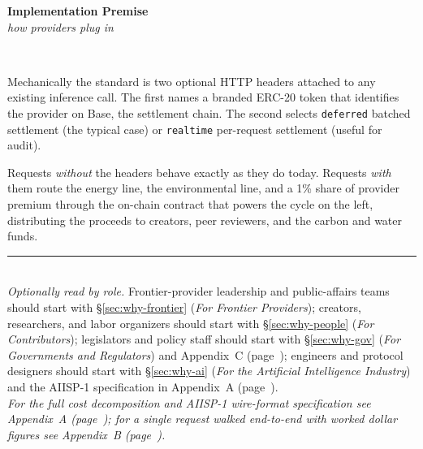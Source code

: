 \documentclass[10pt,a4paper,twocolumn]{article}
\begin{document}
\hfill
\begin{minipage}[t]{0.40\textwidth}
\vspace{0pt}
\centering
{\normalsize\bfseries Implementation Premise}\\[3pt]
{\scriptsize\itshape how providers plug in}\\[10pt]
\raggedright
{}\\[8pt]
{\small Mechanically the standard is two optional HTTP headers attached to any existing inference call. The first names a branded ERC-20 token that identifies the provider on Base, the settlement chain. The second selects \texttt{deferred} batched settlement (the typical case) or \texttt{realtime} per-request settlement (useful for audit).\par
\vspace{4pt}
Requests \emph{without} the headers behave exactly as they do today. Requests \emph{with} them route the energy line, the environmental line, and a 1\% share of provider premium through the on-chain contract that powers the cycle on the left, distributing the proceeds to creators, peer reviewers, and the carbon and water funds.}
\end{minipage}

\vfill
\noindent\rule{0.4\textwidth}{0.3pt}\\[6pt]
{\footnotesize\itshape Optionally read by role.} {\footnotesize Frontier-provider leadership and public-affairs teams should start with \S\ref{sec:why-frontier} (\emph{For Frontier Providers}); creators, researchers, and labor organizers should start with \S\ref{sec:why-people} (\emph{For Contributors}); legislators and policy staff should start with \S\ref{sec:why-gov} (\emph{For Governments and Regulators}) and Appendix~C (page~\pageref{sec:appendix-regulators}); engineers and protocol designers should start with \S\ref{sec:why-ai} (\emph{For the Artificial Intelligence Industry}) and the AIISP-1 specification in Appendix~A (page~\pageref{sec:appendix-standard}).}\\[6pt]
{\footnotesize\itshape For the full cost decomposition and AIISP-1 wire-format specification see Appendix~A (page~\pageref{sec:appendix-standard}); for a single request walked end-to-end with worked dollar figures see Appendix~B (page~\pageref{sec:appendix-lifecycle}).}
\vspace{1.5em}
\end{document}
